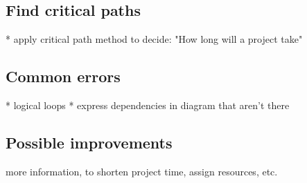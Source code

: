 \subsection{Find critical paths}\label{sec:Find_criticial_paths}
* apply critical path method to decide: "How long will a project take"

\subsection{Common errors}
* logical loops
* express dependencies in diagram that aren't there

\subsection{Possible improvements}
more information, to shorten project time, assign resources, etc.
